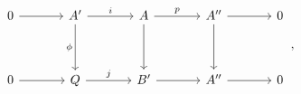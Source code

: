 \[
\begin{tikzcd}[column sep=3.5em, row sep=3.6em]
 0 \arrow[r]
 & A' \arrow[r,"i"] \arrow[d,"\phi"']
 & A \arrow[r,"p"] \arrow[d]
 & A'' \arrow[r] \arrow[d]
 & 0
 \\
 0 \arrow[r]
 & Q \arrow[r,"j"]
 & B' \arrow[r]
 & A'' \arrow[r]
 & 0
\end{tikzcd}
\, ,
\]
